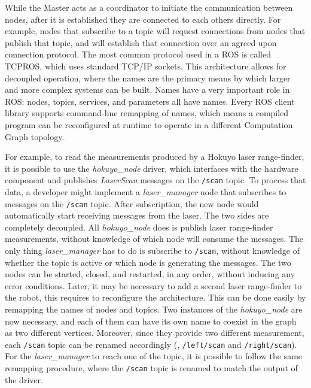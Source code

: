 While the Master acts as a coordinator to initiate the communication between nodes, after it is established they are connected to each others directly. For example, nodes that subscribe to a topic will request connections from nodes that publish that topic, and will establish that connection over an agreed upon connection protocol. The most common protocol used in a ROS is called TCPROS, which uses standard TCP/IP sockets. This architecture allows for decoupled operation, where the names are the primary means by which larger and more complex systems can be built. Names have a very important role in ROS: nodes, topics, services, and parameters all have names. Every ROS client library supports command-line remapping of names, which means a compiled program can be reconfigured at runtime to operate in a different Computation Graph topology.

For example, to read the measurements produced by a Hokuyo laser range-finder, it is possible to use the \textit{hokuyo\_node} driver, which interfaces with the hardware component and publishes \textit{LaserScan} messages on the \texttt{/scan} topic. To process that data, a developer might implement a \textit{laser\_manager} node that subscribes to messages on the \texttt{/scan} topic. After subscription, the new node would automatically start receiving messages from the laser. The two sides are completely decoupled. All \textit{hokuyo\_node} does is publish laser range-finder measurements, without knowledge of which node will consume the messages. The only thing \textit{laser\_ma\-na\-ger} has to do is subscribe to \texttt{/scan}, without knowledge of whether the topic is active or which node is generating the messages. The two nodes can be started, closed, and restarted, in any order, without inducing any error conditions. Later, it may be necessary to add a second laser range-finder to the robot, this requires to reconfigure the architecture. This can be done easily by remapping the names of nodes and topics. Two instances of the \textit{hokuyo\_node} are now necessary, and each of them can have its own name to coexist in the graph as two different vertices. Moreover, since they provide two different measurement, each \texttt{/scan} topic can be renamed accordingly (\eg, \texttt{/left/scan} and \texttt{/right/scan}). For the \textit{laser\_manager} to reach one of the topic, it is possible to follow the same remapping procedure, where the \texttt{/scan} topic is renamed to match the output of the driver.

